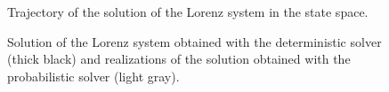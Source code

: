 \begin{figure}[t]
	\centering
	\resizebox{0.7\linewidth}{!}{}
	\caption{Trajectory of the solution of the Lorenz system in the state space.}
	\label{fig:LorenzTraj}
\end{figure}

\begin{figure}[t]
	\centering
	\begin{subfigure}{1\linewidth}
		\resizebox{1.0\linewidth}{!}{}
	\end{subfigure}
	\begin{subfigure}{1\linewidth}
		\resizebox{1.0\linewidth}{!}{}
	\end{subfigure}
	\begin{subfigure}{1\linewidth}
		\resizebox{1.0\linewidth}{!}{}
	\end{subfigure}
	\caption{Solution of the Lorenz system obtained with the deterministic solver (thick black) and realizations of the solution obtained with the probabilistic solver (light gray).}
	\label{fig:Lorenz}
\end{figure}
